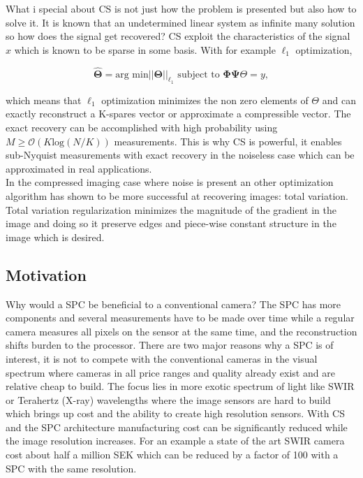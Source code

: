 What i special about CS is not just how the problem is presented but also how to solve it. It is known that an undetermined linear system as infinite many solution so how does the signal get recovered? CS exploit the characteristics of the signal $x$ which is known to be sparse in some basis. With for example $\ell_1$ optimization,

\begin{equation}
\label{eq:l1_1}
\widehat{\mathbf{\Theta}} = \text{arg min} ||\mathbf{\Theta} ||_{\ell_1} \text{ subject to } \mathbf{\Phi} \mathbf{\Psi} \Theta = y,
\end{equation}    

which means that $\ell_1$ optimization minimizes the non zero elements of $\Theta$ and can exactly reconstruct a K-spares vector or approximate a compressible vector. The exact recovery can be accomplished with high probability using $M \geq \mathcal{O}(K\text{log}(N/K))$ measurements. This is why CS is powerful, it enables sub-Nyquist measurements with exact recovery in the noiseless case which can be approximated in real applications.\\[0.1in]

In the compressed imaging case where noise is present an other optimization algorithm has shown to be more successful at recovering images: total variation. Total variation regularization minimizes the magnitude of the gradient in the image and doing so it preserve edges and piece-wise constant structure in the image which is desired.     

 
\subsection{Motivation}
Why would a SPC be beneficial to a conventional camera? The SPC has more components and several measurements have to be made over time while a regular camera measures all pixels on the sensor at the same time, and the reconstruction shifts burden to the processor. There are two major reasons why a SPC is of interest, it is not to compete with the conventional cameras in the visual spectrum where cameras in all price ranges and quality already exist and are relative cheap to build. The focus lies in more exotic spectrum of light like SWIR or Terahertz (X-ray) wavelengths where the image sensors are hard to build which brings up cost and the ability to create high resolution sensors. With CS and the SPC architecture manufacturing cost can be significantly reduced while the image resolution increases. For an example a state of the art SWIR camera cost about half a million SEK which can be reduced by a factor of 100 with a SPC with the same resolution. 

